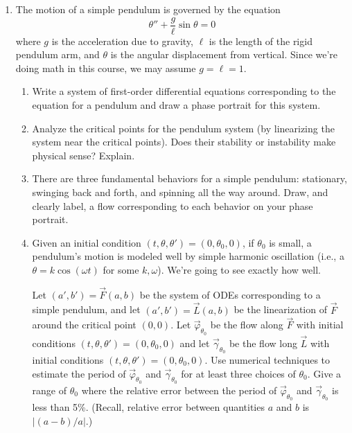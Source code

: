 \documentclass[letter]{article}
\begin{document}
\begin{enumerate}
		\item The motion of a simple pendulum is governed by the equation
			\[
				\theta'' + \frac{g}{\ell}\sin\theta=0
			\]
			where $g$ is the acceleration due to gravity, $\ell$ is the length of
			the rigid pendulum arm, and $\theta$ is the angular displacement from vertical.  Since
			we're doing math in this course, we may assume $g=\ell=1$.
			\begin{enumerate}
				\item Write a system of first-order differential equations corresponding
					to the equation for a pendulum and draw a phase portrait for this system.
				\item Analyze the critical points for the pendulum system (by
					linearizing the system near the critical points).  Does their stability
					or instability make physical sense?  Explain.
				\item There are three fundamental behaviors for a simple pendulum: stationary,
					swinging back and forth, and spinning all the way around.  Draw, and clearly
					label, a flow corresponding to each behavior on your phase portrait.
				\item Given an initial condition $(t,\theta,\theta')=(0,\theta_0,0)$, if $\theta_0$ is
					small, a pendulum's motion is modeled well by simple harmonic oscillation (i.e.,
					a $\theta=k\cos(\omega t)$ for some $k,\omega$).  We're going to see exactly how well.

					Let $(a',b')=\vec F(a,b)$ be the system of ODEs corresponding to a simple
					pendulum, and let $(a',b')=\vec L(a,b)$ be the linearization of $\vec F$ around
					the critical point $(0,0)$.					
					Let $\vec\varphi_{\theta_0}$ be the
					flow along $\vec F$ with initial conditions
					$(t,\theta,\theta')=(0,\theta_0,0)$ and let $\vec\gamma_{\theta_0}$ be 
					the flow long $\vec L$ with initial conditions
					$(t,\theta,\theta')=(0,\theta_0,0)$.  Use numerical techniques to
					estimate the period of $\vec\varphi_{\theta_0}$ and $\vec\gamma_{\theta_0}$ 
					for at least three choices of $\theta_0$.  Give a range of $\theta_0$
					where the relative error between the period of $\vec\varphi_{\theta_0}$ and $\vec\gamma_{\theta_0}$
					is less than 5\%.  (Recall, relative error between quantities $a$ and $b$ is $|(a-b)/a|$.)

			\end{enumerate}


\end{enumerate}
\end{document}
